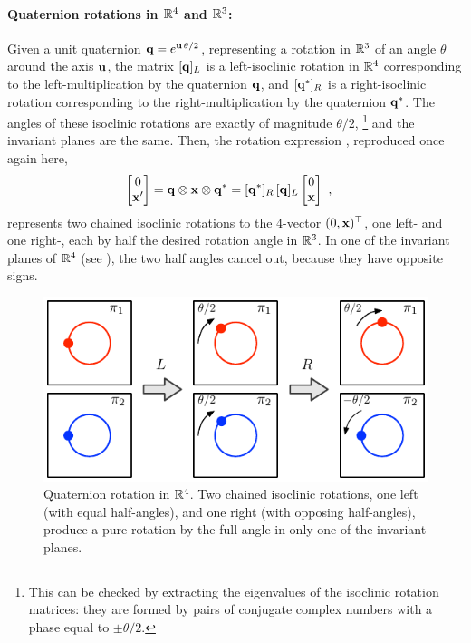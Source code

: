 \paragraph{Quaternion rotations in ${\mathbb R}^4$ and ${\mathbb R}^3$:}
% 
Given a unit quaternion ${\bf q}=e^{{\bf u}\,\theta/2}$, representing a rotation in ${\mathbb R}^3$ of an angle $\theta$ around the axis ${\bf u}$, 
the matrix $[{\bf q}]_L$ is a left-isoclinic rotation in ${\mathbb R}^4$ corresponding to the left-multiplication by the quaternion ${\bf q}$, 
and  $[{\bf q}^*]_R$ is a right-isoclinic rotation corresponding to the right-multiplication by the quaternion ${\bf q}^*$. 
The angles of these isoclinic rotations are exactly of magnitude $\theta/2$,%
\footnote{This can be checked by extracting the eigenvalues of the isoclinic rotation matrices: they are formed by pairs of conjugate complex numbers with a phase equal to $\pm\theta/2$.}
and the invariant planes are the same.
Then, the rotation expression , reproduced once again here,
%
\begin{align*}
\begin{bmatrix}
0 \\ {\bf x}'
\end{bmatrix}={\bf q}\otimes{\bf x}\otimes{\bf q}^*
&= [{\bf q}^*]_R\,[{\bf q}]_L\begin{bmatrix}
0 \\ {\bf x}
\end{bmatrix} 
~,
\end{align*}
%
represents two chained isoclinic rotations to the 4-vector $(0,{\bf x})^{\top}$, one left- and one right-, each by half the desired rotation angle in ${\mathbb R}^3$. 
In one of the invariant planes of ${\mathbb R}^4$ (see ), the two half angles cancel out, because they have opposite signs. 
%
\begin{figure}[tb]
\begin{center}
\includegraphics{figures/isoclinicQ}
\caption{%
Quaternion rotation in ${\mathbb R}^4$.
Two chained isoclinic rotations, one left (with equal half-angles), and one right (with opposing half-angles), produce a pure rotation by the full angle in only one of the invariant planes.
}
\label{fig:isoclinicQ}
\end{center}
\end{figure}
